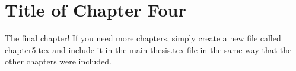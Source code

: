 \chapter{Title of Chapter Four}

The final chapter! If you need more chapters, simply create a new file called \url{chapter5.tex} and include it in the main \url{thesis.tex} file in the same way that the other chapters were included.

